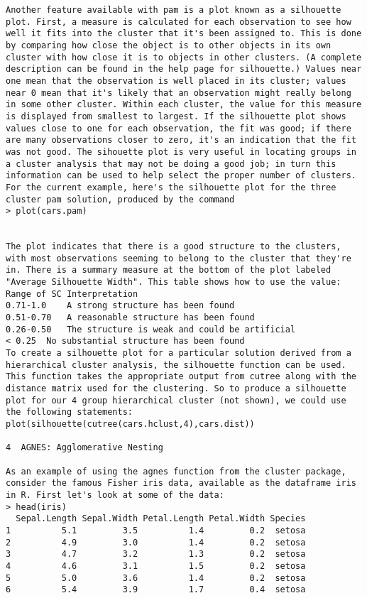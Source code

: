 {\begin{framed}
\begin{verbatim}
Another feature available with pam is a plot known as a silhouette plot. First, a measure is calculated for each observation to see how well it fits into the cluster that it's been assigned to. This is done by comparing how close the object is to other objects in its own cluster with how close it is to objects in other clusters. (A complete description can be found in the help page for silhouette.) Values near one mean that the observation is well placed in its cluster; values near 0 mean that it's likely that an observation might really belong in some other cluster. Within each cluster, the value for this measure is displayed from smallest to largest. If the silhouette plot shows values close to one for each observation, the fit was good; if there are many observations closer to zero, it's an indication that the fit was not good. The sihouette plot is very useful in locating groups in a cluster analysis that may not be doing a good job; in turn this information can be used to help select the proper number of clusters. For the current example, here's the silhouette plot for the three cluster pam solution, produced by the command
> plot(cars.pam)


The plot indicates that there is a good structure to the clusters, with most observations seeming to belong to the cluster that they're in. There is a summary measure at the bottom of the plot labeled "Average Silhouette Width". This table shows how to use the value:
Range of SC	Interpretation
0.71-1.0	A strong structure has been found
0.51-0.70	A reasonable structure has been found
0.26-0.50	The structure is weak and could be artificial
< 0.25	No substantial structure has been found
To create a silhouette plot for a particular solution derived from a hierarchical cluster analysis, the silhouette function can be used. This function takes the appropriate output from cutree along with the distance matrix used for the clustering. So to produce a silhouette plot for our 4 group hierarchical cluster (not shown), we could use the following statements:
plot(silhouette(cutree(cars.hclust,4),cars.dist))

4  AGNES: Agglomerative Nesting

As an example of using the agnes function from the cluster package, consider the famous Fisher iris data, available as the dataframe iris in R. First let's look at some of the data:
> head(iris)
  Sepal.Length Sepal.Width Petal.Length Petal.Width Species
1          5.1         3.5          1.4         0.2  setosa
2          4.9         3.0          1.4         0.2  setosa
3          4.7         3.2          1.3         0.2  setosa
4          4.6         3.1          1.5         0.2  setosa
5          5.0         3.6          1.4         0.2  setosa
6          5.4         3.9          1.7         0.4  setosa


\end{verbatim}
\end{framed}}
